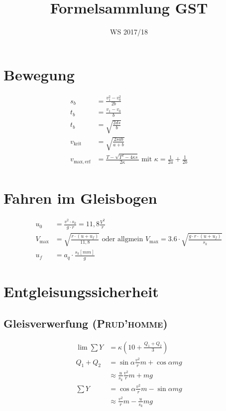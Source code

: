 \documentclass{scrartcl}
\title{Formelsammlung GST}
\date{WS 2017/18}
\begin{document}
	\maketitle
	\section{Bewegung}
	\begin{align*}
		s_b &= \frac{v_1^2 - v_0^2}{2b} \\
		t_b &= \frac{v_1 - v_0}{b} \\
		t_b &= \sqrt{\frac{2ds}{b}} \\
		v_\mathrm{krit} &= \sqrt{\frac{2sab}{a+b}} \\
		v_\mathrm{max,erf} &= \frac{T-\sqrt{T^2-4\kappa{}s}}{2\kappa} \text{ mit } \kappa = \frac{1}{2a}+\frac{1}{2b} \\
	\end{align*}

	\section{Fahren im Gleisbogen}
	\begin{align*}
		u_0 &= \frac{v^2 \cdot s_k}{g\cdot r} = 11,8\frac{V^2}{r} \\
		V_{\text{max}} &= \sqrt{\frac{r\cdot(u+u_f)}{11,8}} \text{ oder allgmein } V_{\text{max}} = 3.6 \cdot \sqrt{\frac{g\cdot r \cdot (u + u_f)}{s_k}} \\
		u_f &= a_q \cdot \frac{s_k[mm]}{g}
	\end{align*}

	\section{Entgleisungssicherheit}
	\subsection{Gleisverwerfung (\textsc{Prud'homme})}
	\begin{align*}
		\lim\sum{}Y &= \kappa\left(10+\frac{Q_1+Q_2}{3}\right) \\
		Q_1+Q_2 &= \sin\alpha\frac{v^2}{r}m+\cos\alpha{}mg \\
						&\approx \frac{u}{s_k}\frac{v^2}{r}m+mg \\
		\sum{}Y &= \cos\alpha\frac{v^2}{r}m-\sin\alpha{}mg \\
						&\approx \frac{v^2}{r}m - \frac{u}{s_k}mg
	\end{align*}
\end{document}
